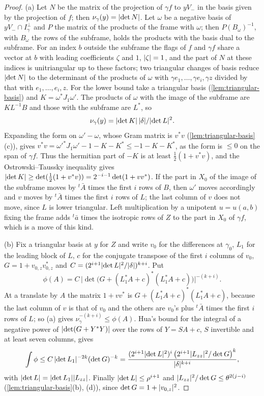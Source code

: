 \begin{proof}
(a) Let $N$ be the matrix of the projection of $\gamma f$ to $yV_-$ in the basis given by the projection of $f$; then $\nu_\gamma(y)=\lvert \det N\rvert$. Let $\omega$ be a negative basis of $yV_-\cap I_\gamma^\perp$ and $P$ the matrix of
the products of the frame with $\omega$; then $P(B_\omega)^{-1}$, with $B_\omega$ the rows of the subframe, holds the products with the basis dual to the subframe. For an index $b$ outside the subframe the
flags of $f$ and $\gamma f$ share a vector at $b$ with leading coefficients $\zeta$ and $1$, $\lvert \zeta\rvert=1$, and the part of $N$ at these indices is unitriangular up to these factors; two triangular changes of basis
reduce $\lvert \det N\rvert$ to the determinant of the products of $\omega$ with $\gamma e_1,\dots,\gamma e_i,\gamma z$ divided by that with $e_1,\dots,e_i,z$. For the lower bound take a triangular basis
(\cref{lem:triangular-basis}) and $K=\omega^*J_1\omega'$. The products of $\omega$ with the image of the subframe are $KL^{-1}B$ and those with the subframe are $L^*$, so
\[
  \nu_\gamma(y)=\lvert \det K\rvert\,\lvert \delta\rvert/\lvert \det L\rvert^2.
\]
Expanding the form on $\omega'-\omega$, whose Gram matrix is $v^*v$ (\cref{lem:triangular-basis}(c)), gives $v^*v=\omega'^*J_1\omega'-1-K-K^*\le-1-K-K^*$, as the form is $\le0$ on the span of $\gamma f$. Thus the hermitian part of
$-K$ is at least $\frac12(1+v^*v)$, and the Ostrowski--Taussky inequality \cite{OstrowskiTaussky1951} gives $\lvert \det K\rvert\ge\det(\frac12(1+v^*v))=2^{-i-1}\det(1+vv^*)$. If the part in $X_0$ of the image of the subframe
moves by ${}^t\bar A$ times the first $i$ rows of $B$, then $\omega'$ moves accordingly and $v$ moves by ${}^t\bar A$ times the first $i$ rows of $L$; the last column of $v$ does not move, since $L$ is lower
triangular. Left multiplication by a unipotent $u=u(a,b)$ fixing the frame adds ${}^t\bar a$ times the isotropic rows of $Z$ to the part in $X_0$ of $\gamma f$, which is a move of this kind.

(b) Fix a triangular basis at $y$ for $Z$ and write $v_0$ for the differences at $\gamma_0$, $L_1$ for the leading block of $L$, $c$ for the conjugate transpose of the first $i$ columns of $v_0$,
$G=1+v_{0,z}v_{0,z}^*$ and $C=(2^{i+1}\lvert \det L\rvert^2/\lvert \delta\rvert)^{k+i}$. Put
\[
  \phi(A)=C\,\bigl\lvert\det\bigl(G+(L_1^*A+c)^*(L_1^*A+c)\bigr)\bigr\rvert^{-(k+i)}.
\]
At a translate by $A$ the matrix $1+vv^*$ is $G+(L_1^*A+c)^*(L_1^*A+c)$, because the last column of $v$ is that of $v_0$ and the others are $v_0$'s plus ${}^t\bar A$ times the first $i$ rows of $L$; so (a)
gives $\nu_\gamma^{-(k+i)}\le\phi(A)$. Hua's bound \cite{Hua1963} for the integral of a negative power of $\lvert \det(G+Y^*Y)\rvert$ over the rows of $Y=SA+c$, $S$ invertible and at least seven columns, gives
\[
  \int\phi\le C\,\lvert \det L_1\rvert^{-2k}(\det G)^{-k}=\frac{(2^{i+1}\lvert \det L\rvert^2)^i\,\bigl(2^{i+1}\lvert L_{zz}\rvert^2/\det G\bigr)^k}{\lvert \delta\rvert^{k+i}},
\]
with $\lvert \det L\rvert=\lvert \det L_1\rvert\lvert L_{zz}\rvert$. Finally $\lvert \det L\rvert\le\rho^{i+1}$ and $\lvert L_{zz}\rvert^2/\det G\le\theta^{2(j-i)}$ (\cref{lem:triangular-basis}(b), (d)), since $\det G=1+\lvert v_{0,z}\rvert^2$.
\end{proof}

